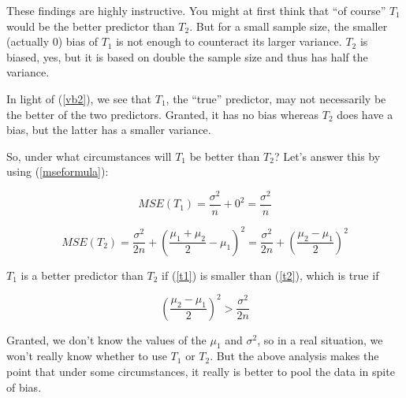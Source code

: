

These findings are highly instructive.  You might at first think that
``of course'' $T_1$ would be the better predictor than $T_2$.  But for a
small sample size, the smaller (actually 0) bias of $T_1$ is not enough
to counteract its larger variance.  $T_2$ is biased, yes, but it is
based on double the sample size and thus has half the variance.

In light of (\ref{vb2}), we see that $T_1$, the ``true'' predictor, may
not necessarily be the better of the two predictors.  Granted, it has no 
bias whereas $T_2$ does have a bias, but the latter has a smaller
variance.

So, under what circumstances will $T_1$ be better than $T_2$?  Let's
answer this by using (\ref{mseformula}):

\begin{equation}
\label{t1}
MSE(T_1) = \frac{\sigma^2}{n} + 0^2 = \frac{\sigma^2}{n} 
\end{equation}

\begin{equation}
\label{t2}
MSE(T_2) = \frac{\sigma^2}{2n} + \left ( \frac{\mu_1+\mu_2}{2} - \mu_1
\right )^2 = \frac{\sigma^2}{2n} + \left ( \frac{\mu_2-\mu_1}{2} \right
)^2
\end{equation}

$T_1$ is a better predictor than $T_2$ if (\ref{t1}) is smaller than
(\ref{t2}), which is true if

\begin{equation}
\label{betteriff}
\left ( \frac{\mu_2-\mu_1}{2} \right)^2 >
\frac{\sigma^2}{2n}
\end{equation}

Granted, we don't know the values of the $\mu_1$ and $\sigma^2$, so in a
real situation, we won't really know whether to use $T_1$ or $T_2$.  But
the above analysis makes the point that under some circumstances, it
really is better to pool the data in spite of bias.


